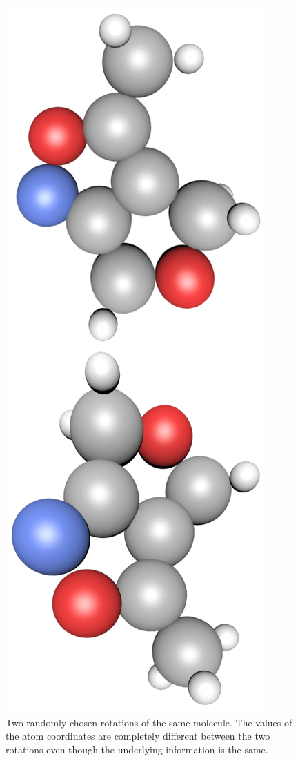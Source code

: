\begin{figure}[H]
	\centering
	\includegraphics[angle=270, width=\linewidth]{figures/rotation}
	\caption{Two randomly chosen rotations of the same molecule. The values of the atom coordinates are completely different between the two rotations even though the underlying information is the same.}
	\label{fig:rotation}
\end{figure}

